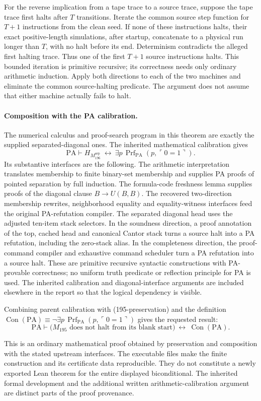 For the reverse implication from a tape trace to a source trace, suppose
the tape trace first halts after $T$ transitions. Iterate the common
source step function for $T+1$ instructions from the clean seed. If none
of these instructions halts, their exact positive-length simulations,
after startup, concatenate to a physical run longer than $T$, with no
halt before its end. Determinism contradicts the alleged first halting
trace. Thus one of the first $T+1$ source instructions halts. This
bounded iteration is primitive recursive; its correctness needs only
ordinary arithmetic induction. Apply both directions to each of the
two machines and eliminate the common source-halting predicate. The
argument does not assume that either machine actually fails to halt.

\paragraph{Composition with the PA calibration.}
The numerical calculus and proof-search program in this theorem are
exactly the supplied separated-diagonal ones. The inherited mathematical
calibration gives
\[
 \mathrm{PA}\vdash
 H_{M_{196}^{\mathrm{sep}}}
 \ \longleftrightarrow\
 \exists p\,\operatorname{Prf}_{\mathrm{PA}}
       (p,\ulcorner 0=1\urcorner).
\tag{parent-calibration}
\]
Its substantive interfaces are the following. The arithmetic
interpretation translates membership to finite binary-set membership
and supplies PA proofs of pointed separation by full induction. The
formula-code freshness lemma supplies proofs of the diagonal clause
$B\to U(B,B)$. The recovered two-direction membership rewrites,
neighborhood equality and equality-witness interfaces feed the original
PA-refutation compiler. The separated diagonal head uses the adjusted
ten-item stack selectors. In the soundness direction, a proof annotation
of the top, cached head and canonical Cantor stack turns a source halt
into a PA refutation, including the zero-stack alias. In the completeness
direction, the proof-command compiler and exhaustive command scheduler
turn a PA refutation into a source halt. These are primitive recursive
syntactic constructions with PA-provable correctness; no uniform truth
predicate or reflection principle for PA is used. The inherited
calibration and diagonal-interface arguments are included elsewhere in
the report so that the logical dependency is visible.

Combining parent calibration with (195-preservation) and the definition
$\operatorname{Con}(\mathrm{PA})\equiv
\neg\exists p\,\operatorname{Prf}_{\mathrm{PA}}
(p,\ulcorner0=1\urcorner)$ gives the requested result:
\[
 \boxed{\displaystyle
 \mathrm{PA}\vdash
 \bigl(M_{195}\text{ does not halt from its blank start}\bigr)
 \ \longleftrightarrow\ \operatorname{Con}(\mathrm{PA}).}
\]

This is an ordinary mathematical proof obtained by preservation and
composition with the stated upstream interfaces. The executable files
make the finite construction and its certificate data reproducible.
They do not constitute a newly exported Lean theorem for the entire
displayed biconditional. The inherited formal development and the
additional written arithmetic-calibration argument are distinct parts
of the proof provenance.
